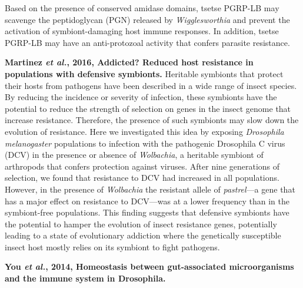 \documentclass[11pt]{article}
\begin{document}
\begin{sloppypar}
Based on the presence of conserved amidase domains, tsetse PGRP-LB may scavenge the peptidoglycan (PGN) released by \textit{Wigglesworthia} and prevent the activation of symbiont-damaging host immune responses. 
In addition, tsetse PGRP-LB may have an anti-protozoal activity that confers parasite resistance. 
\par
\textbf{Martinez \textit{et al.}, 2016, Addicted? Reduced host resistance in populations with defensive symbionts.} \newline
Heritable symbionts that protect their hosts from pathogens have been described in a wide range of insect species. 
By reducing the incidence or severity of infection, these symbionts have the potential to reduce the strength of selection on genes in the insect genome that increase resistance. 
Therefore, the presence of such symbionts may slow down the evolution of resistance. 
Here we investigated this idea by exposing \textit{Drosophila melanogaster} populations to infection with the pathogenic Drosophila C virus (DCV) in the presence or absence of \textit{Wolbachia}, a heritable symbiont of arthropods that confers protection against viruses. 
After nine generations of selection, we found that resistance to DCV had increased in all populations. 
However, in the presence of \textit{Wolbachia} the resistant allele of \textit{pastrel}—a gene that has a major effect on resistance to DCV—was at a lower frequency than in the symbiont-free populations. 
This finding suggests that defensive symbionts have the potential to hamper the evolution of insect resistance genes, potentially leading to a state of evolutionary addiction where the genetically susceptible insect host mostly relies on its symbiont to fight pathogens.  
\par
\textbf{You \textit{et al.}, 2014, Homeostasis between gut-associated microorganisms and the immune system in Drosophila.} \newline

\end{sloppypar}
\end{document}
